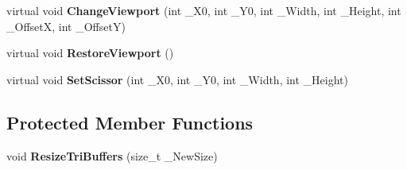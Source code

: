 \begin{DoxyCompactItemize}
\item 
\hypertarget{class_c_tw_graph_open_g_l_core_a0a4278ee3d9c7590f8a9476ba1dab36b}{virtual void {\bfseries Change\+Viewport} (int \+\_\+\+X0, int \+\_\+\+Y0, int \+\_\+\+Width, int \+\_\+\+Height, int \+\_\+\+Offset\+X, int \+\_\+\+Offset\+Y)}\label{class_c_tw_graph_open_g_l_core_a0a4278ee3d9c7590f8a9476ba1dab36b}

\item 
\hypertarget{class_c_tw_graph_open_g_l_core_acdbd767818167b748567ec9fa15f506c}{virtual void {\bfseries Restore\+Viewport} ()}\label{class_c_tw_graph_open_g_l_core_acdbd767818167b748567ec9fa15f506c}

\item 
\hypertarget{class_c_tw_graph_open_g_l_core_a66f35408b5a0ec7313eb7cb2f51f0e99}{virtual void {\bfseries Set\+Scissor} (int \+\_\+\+X0, int \+\_\+\+Y0, int \+\_\+\+Width, int \+\_\+\+Height)}\label{class_c_tw_graph_open_g_l_core_a66f35408b5a0ec7313eb7cb2f51f0e99}

\end{DoxyCompactItemize}
\subsection*{Protected Member Functions}
\begin{DoxyCompactItemize}
\item 
\hypertarget{class_c_tw_graph_open_g_l_core_ad8fcc4bd4e9ff4185b7e4c2efa8c28dd}{void {\bfseries Resize\+Tri\+Buffers} (size\+\_\+t \+\_\+\+New\+Size)}\label{class_c_tw_graph_open_g_l_core_ad8fcc4bd4e9ff4185b7e4c2efa8c28dd}

\end{DoxyCompactItemize}
